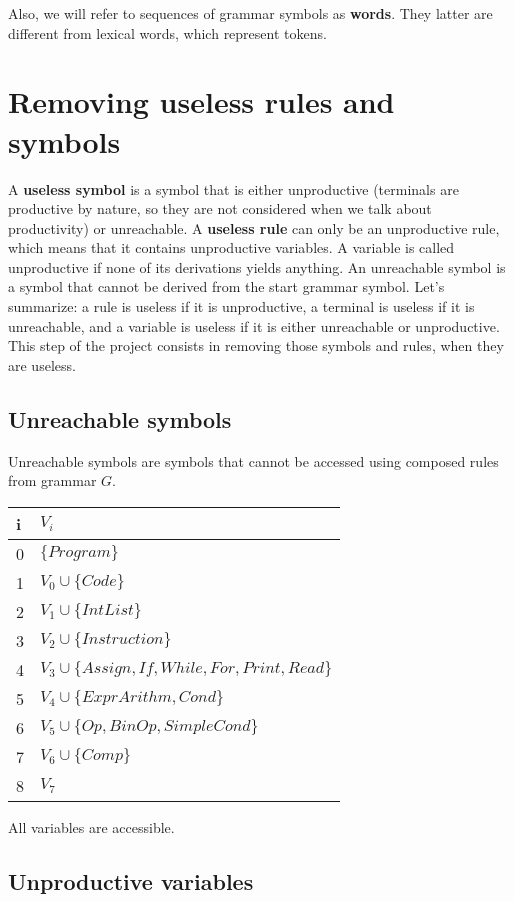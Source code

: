 \documentclass[12pt]{report}
\begin{document}
Also, we will refer to sequences of grammar symbols as \textbf{words}. They latter are different from lexical words, which represent tokens.


\section{Removing useless rules and symbols}

A \textbf{useless symbol} is a symbol that is either unproductive (terminals are productive by nature, so they are not considered when we talk about productivity) or unreachable. A \textbf{useless rule} can only be an unproductive rule, which means that it contains
unproductive variables. A variable is called unproductive if none of its derivations yields anything. An unreachable symbol is a symbol that cannot be derived
from the start grammar symbol. Let's summarize: a rule is useless if it is unproductive, a terminal is useless if it is unreachable, and a variable is useless if it is either unreachable or unproductive. This step of the project consists in removing those symbols and rules, when they are useless.

\subsection{Unreachable symbols}

Unreachable symbols are symbols that cannot be accessed using composed rules from grammar $G$.

\begin{tabular}{|l p{35em}|} \hline
 i & $V_i$ \\ \hline
0 & $\{Program\}$ \\ \hline
1 & $V_0 \cup \{Code\}$ \\ \hline
2 & $V_1 \cup \{IntList\}$ \\ \hline
3 & $V_2 \cup \{Instruction\}$ \\ \hline
4 & $V_3 \cup \{Assign, If, While, For, Print, Read\}$ \\ \hline
5 & $V_4 \cup \{ExprArithm, Cond\}$ \\ \hline
6 & $V_5 \cup \{Op, BinOp, SimpleCond\}$ \\ \hline
7 & $V_6 \cup \{Comp\}$ \\ \hline
8 & $V_7$ \\ \hline
\end{tabular}

All variables are accessible.

\subsection{Unproductive variables}
\end{document}
